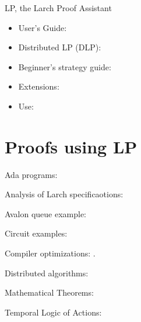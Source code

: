 
LP, the Larch Proof Assistant
\begin{itemize}
\item User's Guide: \cite{Garland91,Garland95}
\item Distributed LP (DLP): \cite{Vandevooorde96}
\item Beginner's strategy guide: \cite{Taylor90}
\item Extensions: \cite{Vogt90}
\item Use: \cite{Bidoit92,Broy92,Buth92,Chetali92,Choppy92,Scott92,Voisin92}
\end{itemize}
\nocite{Garland88a,Garland89}

\section*{Proofs using LP}

Ada programs: \cite{Guaspari92}

Analysis of Larch specificaotions: \cite{Guttag93}
\nocite{Garland90b,Garland90c}

Avalon queue example: \cite{Gong89,Wing89,Wing90a}

Circuit examples: 
\cite{Chetali92,Garland88c,Mellergaard92,Saxe93,Staunstrup89,Staunstrup92}
\nocite{Saxe92}

Compiler optimizations: 
\cite{Vandevoorde92,Vandevoorde93,Vandevoorde94a,Vandevoorde94b}.

Distributed algorithms: \cite{Luchangco94,Petrov96,Sogaard93}

Mathematical Theorems: \cite{Martin90}
\nocite{Lescanne83}

Temporal Logic of Actions: \cite{Engberg92}




